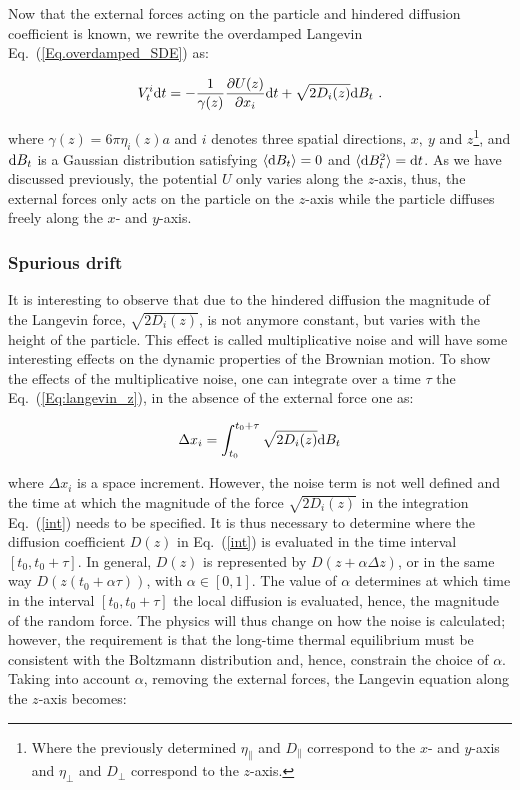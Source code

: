 Now that the external forces acting on the particle and hindered diffusion coefficient is known, we rewrite the overdamped Langevin Eq.~(\ref{Eq.overdamped_SDE}) as:

\begin{equation}
	V_t^i \textnormal{d}t  = -\frac{1}{\gamma(z)}\frac{\partial U(z)}{\partial x_i}  \textnormal{d}t + \sqrt{2D_i (z)}  \textnormal{d}B_t ~.
	\label{Eq:langevin_z}
\end{equation}

where $\gamma(z) = 6 \pi \eta_i(z) a$ and $i$ denotes three spatial directions, $x,~ y$ and $z$\footnote{Where the previously determined $\eta_\parallel$ and $D_\parallel$ correspond to the $x$- and $y$-axis and $\eta_\bot$ and $D_\bot$ correspond to the $z$-axis.}, and  $ \textnormal{d}B_t$ is a Gaussian distribution satisfying $\langle \textnormal{d}B_t \rangle = 0$ and $\langle \textnormal{d}B_t ^2 \rangle = \textnormal{d}t$. As we have discussed previously, the potential $U$ only varies along the $z$-axis, thus, the external forces only acts on the particle on the $z$-axis while the particle diffuses freely along the $x$- and $y$-axis. 

\subsubsection{Spurious drift}

It is interesting to observe that due to the hindered diffusion the magnitude of the Langevin force, $\sqrt{2D_i(z)}$, is not anymore constant, but varies with the height of the particle. This effect is called multiplicative noise and will have some interesting effects on the dynamic properties of the Brownian motion. To show the effects of the multiplicative noise, one can integrate over a time $\tau$ the Eq.~(\ref{Eq:langevin_z}), in the absence of the external force one as:

\begin{equation}
	\Delta x_i = \int_{t_0} ^{t_0 + \tau} \sqrt{2D_i(z)}\textnormal{d}B_t
	\label{int}
\end{equation}

where $\Delta x_i$ is a space increment. However, the noise term is not well defined and the time at which the magnitude of the force $\sqrt{2D_i(z)}$ in the integration Eq.~(\ref{int}) needs to be specified. It is thus necessary to determine where the diffusion coefficient $D(z)$ in Eq.~(\ref{int}) is evaluated in the time interval $[t_0, t_0 + \tau]$. In general, $D(z)$ is represented by $D(z + \alpha \Delta z)$, or in the same way $D(z(t_0 + \alpha \tau))$, with $\alpha \in [0,1]$. The value of $\alpha$ determines at which time in the interval   $[t_0, t_0 + \tau]$ the local diffusion is evaluated, hence, the magnitude of the random force. The physics will thus change on how the noise is calculated; however, the requirement is that the long-time thermal equilibrium must be consistent with the Boltzmann distribution and, hence, constrain the choice of $\alpha$. Taking into account $\alpha$, removing the external forces, the Langevin equation along the $z$-axis becomes:


